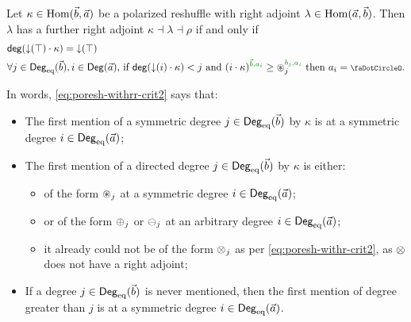 \documentclass[a4paper]{memoir}
\begin{document}
\begin{theorem} \label{thm:poresh-withrr}
	Let $\kappa \in {\mathrm{Hom}}(\vec b, \vec a)$ be a polarized reshuffle with right adjoint $\lambda \in {\mathrm{Hom}}(\vec a, \vec b)$.
	Then $\lambda$ has a further right adjoint $\kappa \dashv \lambda \dashv \rho$ if and only if
	\begin{align}
		&\getdeg(\predeg(\top) \cdot \kappa) = \predeg(\top) \label{eq:poresh-withrr-crit1} \\
		&\text{$\forall j \in \Degeq(\vec b), i \in \Deg(\vec a)$, if $\getdeg(\predeg(i) \cdot \kappa) < j$ and $(i \cdot \kappa)\pmrhom{\vec b}{a_i} \geq \isopol_j\pmrhom{b_j}{a_i}$ then $a_i = \npolar$.} \label{eq:poresh-withrr-crit2}
	\end{align}
\end{theorem}
In words, \cref{eq:poresh-withrr-crit2} says that:
\begin{itemize}
	\item The first mention of a symmetric degree $j \in {\mathsf{Deg}_{\mathrm{eq}}}(\vec b)$ by $\kappa$ is at a symmetric degree $i \in {\mathsf{Deg}_{\mathrm{eq}}}(\vec a)$;
	\item The first mention of a directed degree $j \in {\mathsf{Deg}_{\mathrm{eq}}}(\vec b)$ by $\kappa$ is either:
	\begin{itemize}
		\item of the form ${\oast}_j$ at a symmetric degree $i \in {\mathsf{Deg}_{\mathrm{eq}}}(\vec a)$;
		\item or of the form ${\oplus}_j$ or ${\ominus}_j$ at an arbitrary degree $i \in {\mathsf{Deg}_{\mathrm{eq}}}(\vec a)$;
		\item it already could not be of the form ${\otimes}_j$ as per \cref{eq:poresh-withr-crit2}, as ${\otimes}$ does not have a right adjoint;
	\end{itemize}
	\item If a degree $j \in {\mathsf{Deg}_{\mathrm{eq}}}(\vec b)$ is never mentioned, then the first mention of degree greater than $j$ is at a symmetric degree $i \in {\mathsf{Deg}_{\mathrm{eq}}}(\vec a)$.
\end{itemize}
\end{document}
